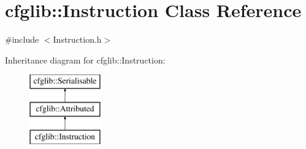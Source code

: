\hypertarget{classcfglib_1_1Instruction}{}\section{cfglib\+:\+:Instruction Class Reference}
\label{classcfglib_1_1Instruction}


{\ttfamily \#include $<$Instruction.\+h$>$}

Inheritance diagram for cfglib\+:\+:Instruction\+:\begin{figure}[H]
\begin{center}
\leavevmode
\includegraphics[height=3.000000cm]{classcfglib_1_1Instruction}
\end{center}
\end{figure}
